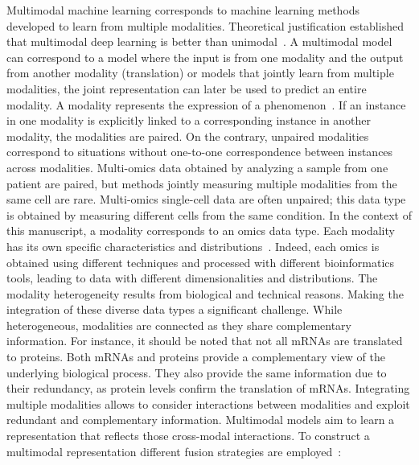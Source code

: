 \documentclass[../main.tex]{subfiles}
\begin{document}
	Multimodal machine learning corresponds to machine learning methods developed to learn from multiple modalities.
	Theoretical justification established that multimodal deep learning is better than unimodal~\cite{NEURIPS2021_5aa3405a}.
	A multimodal model can correspond to a model where the input is from one modality and the output from another modality (translation) or models that jointly learn from multiple modalities, the joint representation can later be used to predict an entire modality.
	A modality represents the expression of a phenomenon~\cite{MML_morency}.
	If an instance in one modality is explicitly linked to a corresponding instance in another modality, the modalities are paired.
	On the contrary, unpaired modalities correspond to situations without one-to-one correspondence between instances across modalities.
	Multi-omics data obtained by analyzing a sample from one patient are paired, but methods jointly measuring multiple modalities from the same cell are rare.
	Multi-omics single-cell data are often unpaired; this data type is obtained by measuring different cells from the same condition.
	In the context of this manuscript, a modality corresponds to an omics data type.
	Each modality has its own specific characteristics and distributions~\cite{Tarazona2021}.
	Indeed, each omics is obtained using different techniques and processed with different bioinformatics tools, leading to data with different dimensionalities and distributions.
	The modality heterogeneity results from biological and technical reasons.
	Making the integration of these diverse data types a significant challenge.
	While heterogeneous, modalities are connected as they share complementary information.
	For instance, it should be noted that not all mRNAs are translated to proteins.
	Both mRNAs and proteins provide a complementary view of the underlying biological process.
	They also provide the same information due to their redundancy, as protein levels confirm the translation of mRNAs.
	Integrating multiple modalities allows to consider interactions between modalities and exploit redundant and complementary information.
	Multimodal models aim to learn a representation that reflects those cross-modal interactions.
	To construct a multimodal representation different fusion strategies are employed~\cite{MML_morency,MMLSurvey}:
\end{document}
